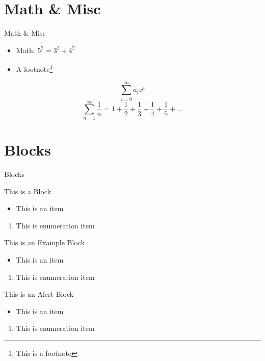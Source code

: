 \documentclass{beamer}
\begin{document}
\section{Math \& Misc}
\begin{frame}{Math \& Misc}
	\begin{itemize}
		\item Math: $5^{2}=3^{2}+4^{2}$
		\item A footnote\footnote{This is a footnote}
	\end{itemize}
	\begin{equation}
		\sum_{i=0}^{\infty} a_i x^i 
	\end{equation}
	\begin{equation}
		\sum_{n = 1}^{\infty} \frac{1}{n} = 1 + \frac{1}{2} + \frac{1}{3} + \frac{1}{4} + \frac{1}{5} + \dots 
	\end{equation}
\end{frame}

\section{Blocks}
\begin{frame}{Blocks}
	\begin{block}{This is a Block}
		\begin{itemize}
			\item This is an item
		\end{itemize}
		\begin{enumerate}
			\item This is enumeration item
		\end{enumerate}
	\end{block}
	\begin{exampleblock}{This is an Example Block}
		\begin{itemize}
			\item This is an item
		\end{itemize}
		\begin{enumerate}
			\item This is enumeration item
		\end{enumerate}
	\end{exampleblock}
	\begin{alertblock}{This is an Alert Block}
		\begin{itemize}
			\item This is an item
		\end{itemize}
		\begin{enumerate}
			\item This is enumeration item
		\end{enumerate}
	\end{alertblock}
\end{frame}
\end{document}
